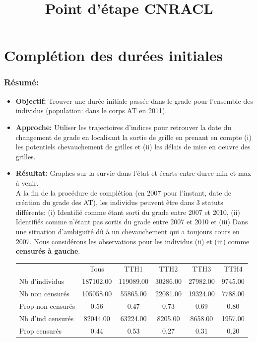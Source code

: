\documentclass[11pt,a4paper]{article}
\begin{document}
\title{Point d'étape CNRACL}


\maketitle

\section{Complétion des durées initiales}

\subsubsection*{Résumé:}

\begin{itemize}[leftmargin=1cm ,parsep=0cm,itemsep=0cm,topsep=0cm] 
\item \textbf{Objectif:} Trouver une durée initiale passée dans le grade pour l'ensemble des individus (population: dans le corps AT en 2011). 
\item \textbf{Approche:} Utiliser les trajectoires d'indices pour retrouver la date du changement de grade en localisant la sortie de grille en prenant en compte (i) les potentiels chevauchement de grilles et (ii) les délais de mise en oeuvre des grilles. 
\item  \textbf{Résultat:} Graphes sur la survie dans l'état et écarts entre duree min et max à venir. \\ A la fin de la procédure de complétion (en 2007 pour l'instant, date de création du grade des AT), les individus peuvent être dans 3 statuts différents: (i) Identifié comme étant sorti du grade entre 2007 et 2010, (ii) Identifiés comme n'étant pas sortis du grade entre 2007 et 2010 et (iii) Dans une situation d'ambiguïté dû à un chevauchement qui a toujours cours en 2007. Nous considérons les observations pour les individus (ii) et (iii) comme \textbf{censurés à gauche}. 

\begin{table}[ht]
\centering
\begingroup\footnotesize
\begin{tabular}{lccccc}
  \hline
 & Tous & TTH1 & TTH2 & TTH3 & TTH4 \\ 
 Nb d'individus & 187102.00 & 119089.00 & 30286.00 & 27982.00 & 9745.00 \\ 
   \hline
Nb non censurés & 105058.00 & 55865.00 & 22081.00 & 19324.00 & 7788.00 \\ 
  Prop non censurés & 0.56 & 0.47 & 0.73 & 0.69 & 0.80 \\ 
   \hline
Nb d'ind censurés & 82044.00 & 63224.00 & 8205.00 & 8658.00 & 1957.00 \\ 
  Prop censurés & 0.44 & 0.53 & 0.27 & 0.31 & 0.20 \\ 
   \hline
\end{tabular}
\endgroup
\end{table}

 
\end{itemize}
\end{document}
